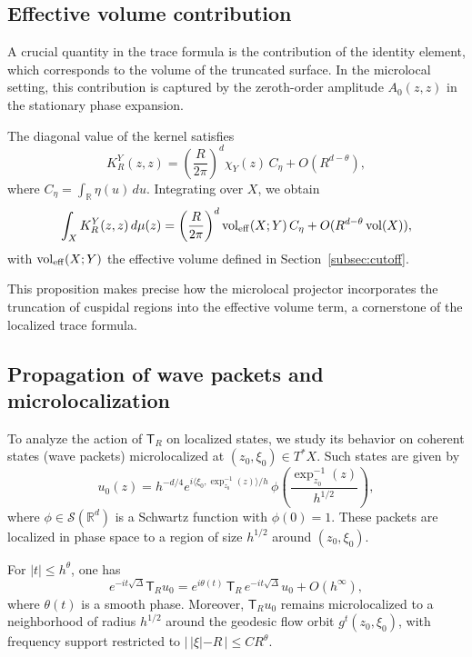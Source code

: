 \subsection{Effective volume contribution}\label{subsec:micro-volume}

A crucial quantity in the trace formula is the contribution of the identity element, which corresponds to the volume of the truncated surface. In the microlocal setting, this contribution is captured by the zeroth-order amplitude $A_0(z,z)$ in the stationary phase expansion.

\begin{proposition}\label{prop:volume}
The diagonal value of the kernel satisfies
\[
K_R^Y(z,z) = \left(\frac{R}{2\pi}\right)^d \chi_Y(z) \, C_\eta + O(R^{d-\theta}),
\]
where $C_\eta = \int_{\mathbb{R}} \eta(u)\,du$. Integrating over $X$, we obtain
\[
\int_X K_R^Y(z,z)\,d\mu(z) = \left(\frac{R}{2\pi}\right)^d \operatorname{vol}_{\mathrm{eff}}(X;Y)\, C_\eta + O(R^{d-\theta} \operatorname{vol}(X)),
\]
with $\operatorname{vol}_{\mathrm{eff}}(X;Y)$ the effective volume defined in Section~\ref{subsec:cutoff}.
\end{proposition}

This proposition makes precise how the microlocal projector incorporates the truncation of cuspidal regions into the effective volume term, a cornerstone of the localized trace formula.

\subsection{Propagation of wave packets and microlocalization}\label{subsec:micro-wavepackets}

To analyze the action of $\mathsf{T}_R$ on localized states, we study its behavior on coherent states (wave packets) microlocalized at $(z_0,\xi_0) \in T^*X$. Such states are given by
\[
u_0(z) = h^{-d/4} e^{i\langle \xi_0, \exp_{z_0}^{-1}(z)\rangle/h}\, \phi\!\left(\frac{\exp_{z_0}^{-1}(z)}{h^{1/2}}\right),
\]
where $\phi \in \mathcal{S}(\mathbb{R}^d)$ is a Schwartz function with $\phi(0)=1$. These packets are localized in phase space to a region of size $h^{1/2}$ around $(z_0,\xi_0)$.

\begin{theorem}\label{thm:wavepacket}
For $|t|\leq h^\theta$, one has
\[
e^{-it\sqrt{\Delta}}\mathsf{T}_R u_0 = e^{i\theta(t)}\,\mathsf{T}_R\, e^{-it\sqrt{\Delta}} u_0 + O(h^\infty),
\]
where $\theta(t)$ is a smooth phase. Moreover, $\mathsf{T}_R u_0$ remains microlocalized to a neighborhood of radius $h^{1/2}$ around the geodesic flow orbit $g^t(z_0,\xi_0)$, with frequency support restricted to $|\,|\xi|-R\,| \leq CR^\theta$.
\end{theorem}

